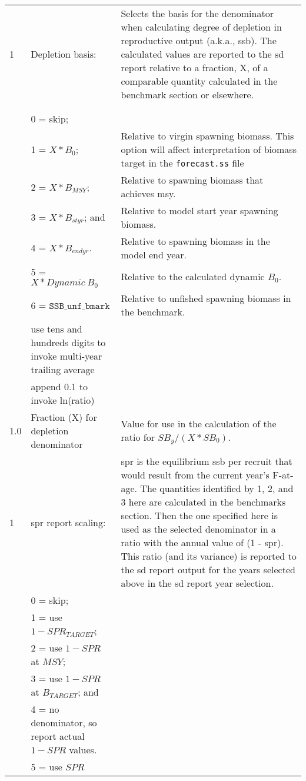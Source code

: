 {\begin{landscape}
\begin{longtable}{p{1.5cm} p{7.2cm} p{12.3cm}}
 \hline
 1 & Depletion basis: & \multirow{1}{12.3cm}[-0.25cm]{\parbox{12.3cm}{Selects the basis for the denominator when calculating degree of depletion in reproductive output (a.k.a., \gls{ssb}). The calculated values are reported to the \gls{sd} report relative to a fraction, X, of a comparable quantity calculated in the benchmark section or elsewhere.}} \Tstrut\\
   & & \\
   & & \\
   & 0 = skip; & \Tstrut \\
   & 1 = $X*B_{0}$; & Relative to virgin spawning biomass. This option will affect interpretation of biomass target in the \texttt{forecast.ss} file \\
   & 2 = $X*B_{MSY}$; & Relative to spawning biomass that achieves \gls{msy}. \\
   & 3 = $X*B_{styr}$; and & Relative to model start year spawning biomass. \\
   & 4 = $X*B_{endyr}$. & Relative to spawning biomass in the model end year. \\
   & 5 = $X*Dynamic~B_{0}$ & Relative to the calculated dynamic $B_{0}$. \\
   & 6 = $\mathtt{SSB\_unf\_bmark}$ & Relative to unfished spawning biomass in the benchmark. \\
   & use tens and hundreds digits to invoke multi-year trailing average & \\
   & append 0.1 to invoke ln(ratio) & \Bstrut\\
  
 \hline
 1.0 & Fraction (X) for depletion denominator & Value for use in the calculation of the ratio for $SB_{y}/(X*SB_{0})$. \Tstrut\Bstrut\\

 \hline
 1 & \Gls{spr} report scaling: & \multirow{1}{12.3cm}[-0.25cm]{\parbox{12.3cm}{\gls{spr} is the equilibrium \gls{ssb} per recruit that would result from the current year's F-at-age. The quantities identified by 1, 2, and 3 here are calculated in the benchmarks section. Then the one specified here is used as the selected denominator in a ratio with the annual value of (1 - \gls{spr}). This ratio (and its variance) is reported to the \gls{sd} report output for the years selected above in the \gls{sd} report year selection.}} \Tstrut\\
   & 0 = skip; & \\
   & 1 = use $1-SPR_{TARGET}$; & \\
   & 2 = use $1-SPR$ at $MSY$; & \Tstrut\\
   & 3 = use $1-SPR$ at $B_{TARGET}$; and &  \Tstrut\\
   & 4 = no denominator, so report actual $1-SPR$ values. & \\
   & 5 = use $SPR$ & \\
  

\end{longtable}
\end{landscape}}
